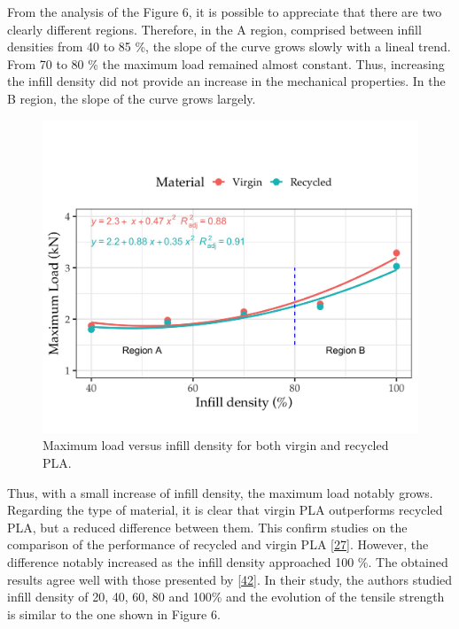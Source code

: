 \documentclass[conference,final,]{IEEEtran}
\begin{document}
From the analysis of the Figure 6, it is possible to appreciate that
there are two clearly different regions. Therefore, in the A region,
comprised between infill densities from 40 to 85 \%, the slope of the
curve grows slowly with a lineal trend. From 70 to 80 \% the maximum
load remained almost constant. Thus, increasing the infill density did
not provide an increase in the mechanical properties. In the B region,
the slope of the curve grows largely.

\begin{figure}

{\centering \includegraphics[width=\linewidth]{Figures/Phase-2} 

}

\caption{Maximum load versus infill density for both virgin and recycled PLA.}\label{fig:Fig.Phase.2}
\end{figure}

Thus, with a small increase of infill density, the maximum load notably
grows. Regarding the type of material, it is clear that virgin PLA
outperforms recycled PLA, but a reduced difference between them. This
confirm studies on the comparison of the performance of recycled and
virgin PLA \protect\hyperlink{ref-CruzSanchez2017}{{[}27{]}}. However,
the difference notably increased as the infill density approached 100
\%. The obtained results agree well with those presented by
\protect\hyperlink{ref-Wang2020h}{{[}42{]}}. In their study, the authors
studied infill density of 20, 40, 60, 80 and 100\% and the evolution of
the tensile strength is similar to the one shown in Figure 6.
\end{document}
